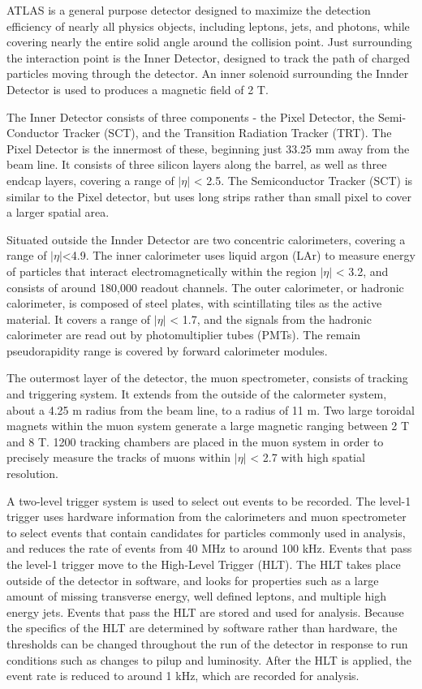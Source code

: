 ATLAS is a general purpose detector designed to maximize the detection efficiency of nearly all physics objects, including leptons, jets, and photons, while covering nearly the entire solid angle around the collision point. Just surrounding the interaction point is the Inner Detector, designed to track the path of charged particles moving through the detector. An inner solenoid surrounding the Innder Detector is used to produces a magnetic field of 2 T.

The Inner Detector consists of three components - the Pixel Detector, the Semi-Conductor Tracker (SCT), and the Transition Radiation Tracker (TRT). The Pixel Detector is the innermost of these, beginning just 33.25 mm away from the beam line. It consists of three silicon layers along the barrel, as well as three endcap layers, covering a range of $|\eta|$ < 2.5. The Semiconductor Tracker (SCT) is similar to the Pixel detector, but uses long strips rather than small pixel to cover a larger spatial area.

Situated outside the Innder Detector are two concentric calorimeters, covering a range of $|\eta|$<4.9. The inner calorimeter uses liquid argon (LAr) to measure energy of particles that interact electromagnetically within the region $|\eta|$ < 3.2, and consists of around 180,000 readout channels.  The outer calorimeter, or hadronic calorimeter, is composed of steel plates, with scintillating tiles as the active material. It covers a range of $|\eta|$ < 1.7, and the signals from the hadronic calorimeter are read out by photomultiplier tubes (PMTs). The remain pseudorapidity range is covered by forward calorimeter modules.

The outermost layer of the detector, the muon spectrometer, consists of tracking and triggering system. It extends from the outside of the calormeter system, about a 4.25 m radius from the beam line, to a radius of 11 m. Two large toroidal magnets within the muon system generate a large magnetic ranging between 2 T and 8 T. 1200 tracking chambers are placed in the muon system in order to precisely measure the tracks of muons within $|\eta|$ < 2.7 with high spatial resolution.

A two-level trigger system is used to select out events to be recorded. The level-1 trigger uses hardware information from the calorimeters and muon spectrometer to select events that contain candidates for particles commonly used in analysis, and reduces the rate of events from 40 MHz to around 100 kHz. Events that pass the level-1 trigger move to the High-Level Trigger (HLT). The HLT takes place outside of the detector in software, and looks for properties such as a large amount of missing transverse energy, well defined leptons, and multiple high energy jets. Events that pass the HLT are stored and used for analysis. Because the specifics of the HLT are determined by software rather than hardware, the thresholds can be changed throughout the run of the detector in response to run conditions such as changes to pilup and luminosity. After the HLT is applied, the event rate is reduced to around 1 kHz, which are recorded for analysis.
